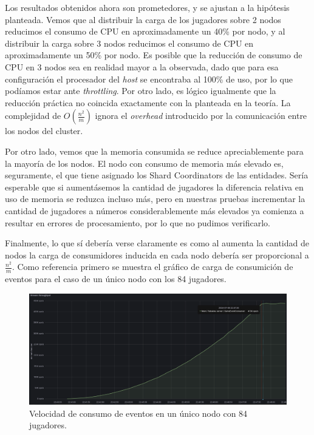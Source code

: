 \noindent Los resultados obtenidos ahora son prometedores, y se ajustan a la hipótesis planteada. Vemos que al distribuir la carga de los jugadores
sobre 2 nodos reducimos el consumo de CPU en aproximadamente un 40\% por nodo, y al distribuir la carga sobre 3 nodos reducimos el consumo de CPU en aproximadamente un 50\% por nodo.
Es posible que la reducción de consumo de CPU en 3 nodos sea en realidad mayor a la observada, dado que para esa configuración el procesador del \textit{host} se encontraba al 100\% de uso,
por lo que podíamos estar ante \textit{throttling}. Por otro lado, es lógico igualmente que la reducción práctica no coincida exactamente con la planteada en la teoría. La complejidad
de $O(\frac{n^2}{m})$ ignora el \textit{overhead} introducido por la comunicación entre los nodos del cluster.

Por otro lado, vemos que la memoria consumida se reduce apreciablemente para la mayoría de los nodos. El nodo con consumo de memoria más elevado es, seguramente, el que tiene
asignado los Shard Coordinators de las entidades. Sería esperable que si aumentásemos la cantidad de jugadores la diferencia relativa en uso de memoria se reduzca incluso más, pero en nuestras pruebas
incrementar la cantidad de jugadores a números considerablemente más elevados ya comienza a resultar en errores de procesamiento, por lo que no pudimos verificarlo.

Finalmente, lo que sí debería verse claramente es como al aumenta la cantidad de nodos la carga de consumidores inducida en cada nodo debería ser proporcional a $\frac{n^2}{m}$.
Como referencia primero se muestra el gráfico de carga de consumición de eventos para el caso de un único nodo con los 84 jugadores.

\begin{figure}[htbp]
    \centering
    \includegraphics[width=1\textwidth]{../assets/fiubakka-consumer-single-node-metrics.png}
    \caption{Velocidad de consumo de eventos en un único nodo con 84 jugadores.}
\end{figure}


